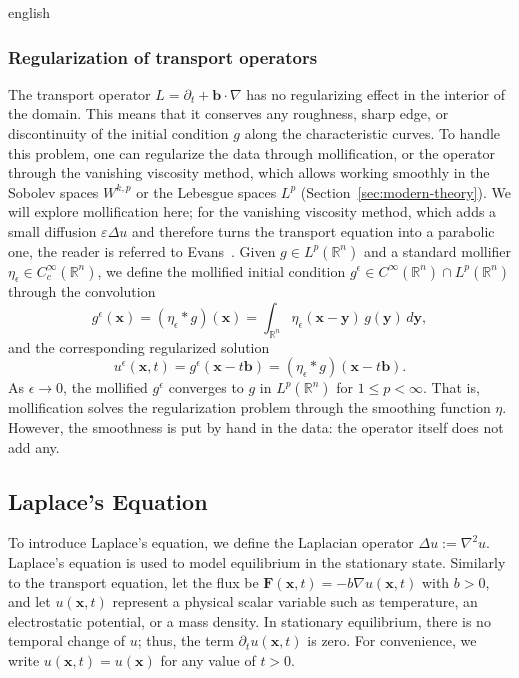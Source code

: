 \documentclass[12pt,letterpaper,twoside]{book}
\begin{document}
\begin{hyphenrules}{english}
\subsubsection{Regularization of transport operators}
The transport operator $L=\partial_t+\mathbf{b}\cdot\nabla$ has no regularizing effect in the interior of the
domain. This means that it conserves any roughness, sharp edge, or discontinuity of the initial
condition $g$ along the characteristic curves. To handle this problem, one can regularize the data
through mollification, or the operator through the vanishing viscosity method, which allows working
smoothly in the Sobolev spaces $W^{k,p}$ or the Lebesgue spaces $L^p$ (Section~\ref{sec:modern-theory}). We
will explore mollification here; for the vanishing viscosity method, which adds a small diffusion
$\varepsilon\Delta u$ and therefore turns the transport equation into a parabolic one, the reader is
referred to Evans~\cite{evans2010}. Given $g\in L^p(\mathbb{R}^n)$ and a standard mollifier
$\eta_\epsilon\in C_c^\infty(\mathbb{R}^n)$, we define the mollified initial condition
$g^\epsilon\in C^\infty(\mathbb{R}^n)\cap L^p(\mathbb{R}^n)$ through the convolution
\begin{equation}
  g^{\epsilon}(\mathbf{x})=(\eta_\epsilon*g)(\mathbf{x})=\int_{\mathbb{R}^n}\eta_\epsilon(\mathbf{x}-\mathbf{y})\,g(\mathbf{y})\,d\mathbf{y},
  \label{eq:mollifier}
\end{equation}
and the corresponding regularized solution
\begin{equation}
  u^{\epsilon}(\mathbf{x},t)=g^{\epsilon}(\mathbf{x}-t\mathbf{b})=(\eta_\epsilon*g)(\mathbf{x}-t\mathbf{b}).
  \label{eq:transport-mollified}
\end{equation}
As $\epsilon\to0$, the mollified $g^\epsilon$ converges to $g$ in $L^p(\mathbb{R}^n)$ for $1\le p<\infty$. That
is, mollification solves the regularization problem through the smoothing function $\eta$. However, the
smoothness is put by hand in the data: the operator itself does not add any.

\subsection{Laplace's Equation}\label{subsec:laplace}

To introduce Laplace's equation, we define the Laplacian operator $\Delta u:=\nabla^2u$. Laplace's
equation is used to model equilibrium in the stationary state. Similarly to the transport equation, let
the flux be $\mathbf{F}(\mathbf{x},t)=-b\nabla u(\mathbf{x},t)$ with $b>0$, and let $u(\mathbf{x},t)$ represent a physical scalar
variable such as temperature, an electrostatic potential, or a mass density. In stationary equilibrium,
there is no temporal change of $u$; thus, the term $\partial_t u(\mathbf{x},t)$ is zero. For convenience, we
write $u(\mathbf{x},t)=u(\mathbf{x})$ for any value of $t>0$.


\end{hyphenrules}
\end{document}
